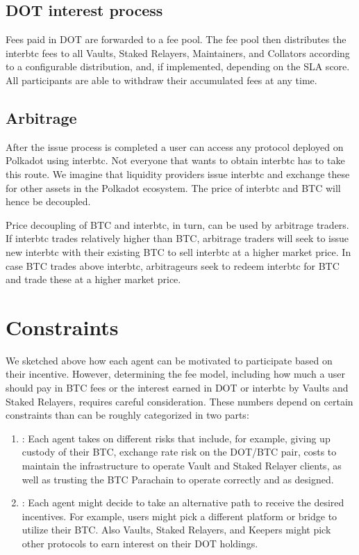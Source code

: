 \documentclass[a4paper,10pt,english]{sphinxmanual}
\begin{document}
\subsection{DOT interest process}
\label{\detokenize{economics/incentives:dot-interest-process}}
Fees paid in DOT are forwarded to a fee pool.
The fee pool then distributes the interbtc fees to all Vaults, Staked Relayers, Maintainers, and Collators according to a configurable distribution, and, if implemented, depending on the SLA score.
All participants are able to withdraw their accumulated fees at any time.


\subsection{Arbitrage}
\label{\detokenize{economics/incentives:arbitrage}}
After the issue process is completed a user can access any protocol deployed on Polkadot using interbtc. Not everyone that wants to obtain interbtc has to take this route. We imagine that liquidity providers issue interbtc and exchange these for other assets in the Polkadot ecosystem. The price of interbtc and BTC will hence be decoupled.

Price decoupling of BTC and interbtc, in turn, can be used by arbitrage traders. If interbtc trades relatively higher than BTC, arbitrage traders will seek to issue new interbtc with their existing BTC to sell interbtc at a higher market price. In case BTC trades above interbtc, arbitrageurs seek to redeem interbtc for BTC and trade these at a higher market price.


\section{Constraints}
\label{\detokenize{economics/incentives:constraints}}
We sketched above how each agent can be motivated to participate based on their incentive. However, determining the fee model, including how much a user should pay in BTC fees or the interest earned in DOT or interbtc by Vaults and Staked Relayers, requires careful consideration. These numbers depend on certain constraints than can be roughly categorized in two parts:
\begin{enumerate}
%
\item {} 
: Each agent takes on different risks that include, for example, giving up custody of their BTC, exchange rate risk on the DOT/BTC pair, costs to maintain the infrastructure to operate Vault and Staked Relayer clients, as well as trusting the BTC Parachain to operate correctly and as designed.

\item {} 
: Each agent might decide to take an alternative path to receive the desired incentives. For example, users might pick a different platform or bridge to utilize their BTC. Also Vaults, Staked Relayers, and Keepers might pick other protocols to earn interest on their DOT holdings.

\end{enumerate}
\end{document}
